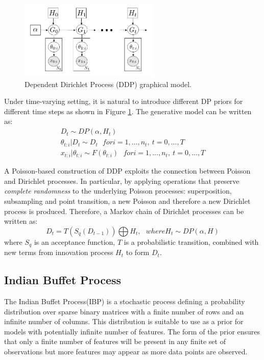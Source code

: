 \begin{figure}[thpb]
    \centering
    \includegraphics[width=0.6\textwidth, trim={10 10 10 10}]{figures/ddp_gm.png}
    \caption{Dependent Dirichlet Process (DDP) graphical model.}
    \label{fig:ddp_gm}
\end{figure}

Under time-varying setting, it is natural to introduce different DP priors for different time steps as shown in Figure \ref{fig:ddp_gm}. The generative model can be written as:
\begin{eqnarray}
    D_t \sim DP(\alpha, H_t)\\
    \theta_{t:i}|D_t \sim D_t ~~~for i=1,...,n_t,~t=0,...,T\\
    x_{t:i}|\theta_{t:i} \sim F(\theta_{t:i}) ~~~for i=1,...,n_t,~t=0,...,T
\end{eqnarray}

A Poisson-based construction of DDP \cite{dhlin10nips} exploits the connection between Poisson and Dirichlet processes. In particular, by applying operations that preserve \textit{complete randomness} to the underlying Poisson processes: superposition, subsampling and point transition, a new Poisson and therefore a new Dirichlet process is produced. Therefore, a Markov chain of Dirichlet processes can be written as:
\begin{equation}
    D_t = T(S_q(D_{t-1}))\bigoplus H_t, ~~~where H_t \sim DP(\alpha, H)
\end{equation}
where $S_q$ is an acceptance function, $T$ is a probabilistic transition, combined with new terms from innovation process $H_t$ to form $D_t$. 


\subsection{Indian Buffet Process}

The Indian Buffet Process(IBP) is a stochastic process defining a probability distribution over sparse binary matrices with a finite number of rows and an infinite number of columns. This distribution is suitable to use as a prior for models with potentially infinite number of features. The form of the prior ensures that only a finite number of features will be present in any finite set of observations but more features may appear as more data points are observed.\\

